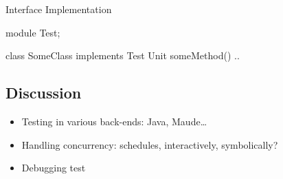 \documentclass[a4paper,11pt,final]{article}
\begin{document}
\noindent Interface Implementation
\begin{absexamplen}
module Test;

class SomeClass implements Test { 
  Unit someMethod() {
  	 ..
  }
}
\end{absexamplen}

\subsection{Discussion}
\begin{itemize}
  \item Testing in various back-ends: Java, Maude\ldots
  \item Handling concurrency: schedules, interactively, symbolically?
  \item Debugging test
\end{itemize}
\end{document}
